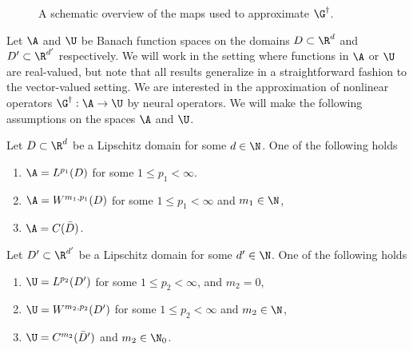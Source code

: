 \begin{figure}[t]
\centering
{}
\hspace*{6.2cm}
\caption{A schematic overview of the maps used to approximate \(\G^\dagger\).} \label{fig:approach}
\end{figure}

Let \(\A\) and \(\U\) be Banach function spaces on the domains \(D \subset \R^d\) and \(D' \subset \R^{d'}\) respectively.
We will work in the setting where functions in \(\A\) or \(\U\) are real-valued, but note that all results generalize 
in a straightforward fashion to the vector-valued setting. We are interested in the approximation of nonlinear operators \(\G^\dagger : \A \to \U\)
by neural operators. We will make the following assumptions on the spaces \(\A\) and \(\U\).

\begin{assumption}
\label{assump:input}
Let \(D \subset \R^d\) be a Lipschitz domain for some \(d \in \N\).
One of the following holds
\begin{enumerate}
	\item \(\A = L^{p_1} (D)\) for some \(1 \leq p_1 < \infty\).
	\item \(\A = W^{m_1,p_1}(D)\) for some \(1 \leq p_1 < \infty\) and \(m_1 \in \N\),
	\item \(\A = C (\bar{D})\).
\end{enumerate}
\end{assumption}

\begin{assumption}
\label{assump:output}
Let \(D' \subset \R^{d'}\) be a Lipschitz domain for some \(d' \in \N\).
One of the following holds
\begin{enumerate}
	\item \(\U = L^{p_2} (D')\) for some \(1 \leq p_2 < \infty\),
	and \(m_2 = 0\),
	\item \(\U = W^{m_2,p_2}(D')\) for some \(1 \leq p_2 < \infty\) and \(m_2 \in \N\),
	\item \(\U = C^{m_2}(\bar{D}')\) and \(m_2 \in \N_0\).  
\end{enumerate}
\end{assumption}


